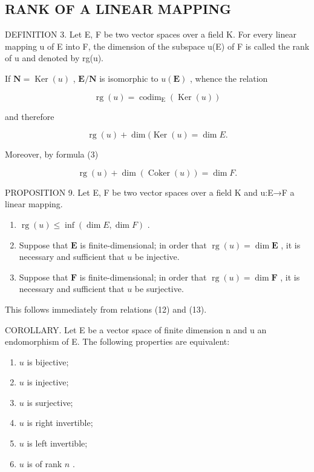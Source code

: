 \subsection{RANK OF A LINEAR MAPPING}

DEFINITION 3. Let E, F be two vector spaces over a field K. For every linear mapping u of E into F, the dimension of the subspace u(E) of F is called the rank of u and denoted by rg(u).

If \(\mathbf{N} = \operatorname{Ker}(u)\) , \(\mathbf{E} / \mathbf{N}\) is isomorphic to \(u(\mathbf{E})\) , whence the relation

\[
\operatorname{rg} (u) = \operatorname{codim} _ {\mathrm{E}} (\operatorname{Ker} (u))\tag{11}
\]

and therefore

\[
\operatorname{rg} (u) + \dim (\operatorname{Ker} (u) = \dim E.\tag{12}
\]

Moreover, by formula (3)

\[
\operatorname{rg} (u) + \dim (\operatorname{Coker} (u)) = \dim F.\tag{13}
\]

PROPOSITION 9. Let E, F be two vector spaces over a field K and u:E→F a linear mapping.

\begin{enumerate}
\def\labelenumi{(\roman{enumi})}
\item
  \(\operatorname{rg}(u) \leqslant \inf(\dim E, \dim F)\) .
\item
  Suppose that \(\mathbf{E}\) is finite-dimensional; in order that \(\operatorname{rg}(u) = \dim \mathbf{E}\) , it is necessary and sufficient that \(u\) be injective.
\item
  Suppose that \(\mathbf{F}\) is finite-dimensional; in order that \(\operatorname{rg}(u) = \dim \mathbf{F}\) , it is necessary and sufficient that \(u\) be surjective.
\end{enumerate}

This follows immediately from relations (12) and (13).

COROLLARY. Let E be a vector space of finite dimension n and u an endomorphism of E. The following properties are equivalent:

\begin{enumerate}
\def\labelenumi{(\alph{enumi})}
\item
  \(u\) is bijective;
\item
  \(u\) is injective;
\item
  \(u\) is surjective;
\item
  \(u\) is right invertible;
\item
  \(u\) is left invertible;
\item
  \(u\) is of rank \(n\) .
\end{enumerate}

